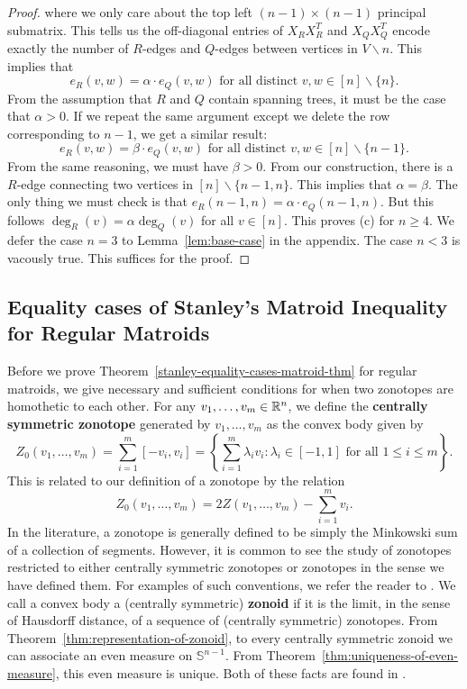 \documentclass{puthesis-UG}
\begin{document}
\begin{proof}
	where we only care about the top left $(n-1) \times (n-1)$ principal submatrix. This tells us the off-diagonal entries of $X_R X_R^T$ and $X_QX_Q^T$ encode exactly the number of $R$-edges and $Q$-edges between vertices in $V \backslash n$. This implies that 
	\[
		e_R(v, w) = \alpha \cdot e_Q(v, w) \text{ for all distinct } v, w \in [n] \backslash \{n\}.
	\]
	From the assumption that $R$ and $Q$ contain spanning trees, it must be the case that $\alpha > 0$. If we repeat the same argument except we delete the row corresponding to $n-1$, we get a similar result:
	\[
		e_R(v, w) = \beta \cdot e_Q(v, w) \text{ for all distinct } v, w \in [n] \backslash \{n-1\}.
	\]
	From the same reasoning, we must have $\beta > 0$. From our construction, there is a $R$-edge connecting two vertices in $[n] \backslash \{n-1, n\}$. This implies that $\alpha = \beta$. The only thing we must check is that $e_R(n-1, n) = \alpha \cdot e_Q(n-1, n)$. But this follows $\deg_R(v) = \alpha \deg_Q(v)$ for all $v \in [n]$. This proves (c) for $n \geq 4$. We defer the case $n = 3$ to Lemma~\ref{lem:base-case} in the appendix. The case $n < 3$ is vacously true. This suffices for the proof.
\end{proof}

\subsection{Equality cases of Stanley's Matroid Inequality for Regular Matroids}

Before we prove Theorem~\ref{stanley-equality-cases-matroid-thm} for regular matroids, we give necessary and sufficient conditions for when two zonotopes are homothetic to each other. For any $v_1, \ldots, v_m \in \mathbb{R}^n$, we define the \textbf{centrally symmetric zonotope} generated by $v_1, \ldots, v_m$ as the convex body given by
\[
	Z_0 (v_1, \ldots, v_m) = \sum_{i = 1}^m [-v_i, v_i] = \left \{ \sum_{i = 1}^m \lambda_i v_i : \lambda_i \in [-1, 1] \text{ for all } 1 \leq i \leq m \right \}.
\]
This is related to our definition of a zonotope by the relation 
\[
	Z_0(v_1, \ldots, v_m) = 2 Z(v_1, \ldots, v_m) - \sum_{i = 1}^m v_i.
\]
In the literature, a zonotope is generally defined to be simply the Minkowski sum of a collection of segments. However, it is common to see the study of zonotopes restricted to either centrally symmetric zonotopes or zonotopes in the sense we have defined them. For examples of such conventions, we refer the reader to \cite{schneider_2013,Shephard_Zonotopes,STANLEY}. We call a convex body a (centrally symmetric) \textbf{zonoid} if it is the limit, in the sense of Hausdorff distance, of a sequence of (centrally symmetric) zonotopes. From Theorem~\ref{thm:representation-of-zonoid}, to every centrally symmetric zonoid we can associate an even measure on $\mathbb{S}^{n-1}$. From Theorem~\ref{thm:uniqueness-of-even-measure}, this even measure is unique. Both of these facts are found in \cite{schneider_2013}. 
\end{document}
